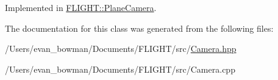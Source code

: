 Implemented in \hyperlink{class_f_l_i_g_h_t_1_1_plane_camera_a806e8a07ea8fad7aee17de4fbbf075c5}{F\+L\+I\+G\+H\+T\+::\+Plane\+Camera}.



The documentation for this class was generated from the following files\+:\begin{DoxyCompactItemize}
\item 
/\+Users/evan\+\_\+bowman/\+Documents/\+F\+L\+I\+G\+H\+T/src/\hyperlink{_camera_8hpp}{Camera.\+hpp}\item 
/\+Users/evan\+\_\+bowman/\+Documents/\+F\+L\+I\+G\+H\+T/src/Camera.\+cpp\end{DoxyCompactItemize}
